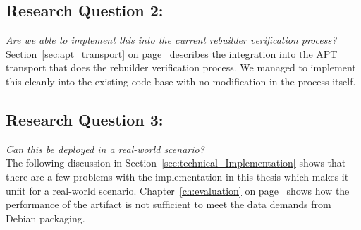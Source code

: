 \documentclass[../Main/thesis.tex]{subfiles}
\begin{document}
\subsection*{Research Question 2:}%
\label{sub:research_question_2_}
\textit{Are we able to implement this into the current rebuilder verification
process?}\\
Section~\ref{sec:apt_transport} on page~\pageref{sec:apt_transport} describes
the integration into the APT transport that does the rebuilder verification
process. We managed to implement this cleanly into the existing code base with
no modification in the process itself.

\subsection*{Research Question 3:}%
\label{sub:research_question_3_}
\textit{Can this be deployed in a real-world scenario?}\\
The following discussion in Section~\ref{sec:technical_Implementation} shows
that there are a few problems with the implementation in this thesis which makes
it unfit for a real-world scenario. Chapter~\ref{ch:evaluation} on
page~\pageref{ch:evaluation} shows how the performance of the artifact is not
sufficient to meet the data demands from Debian packaging.
\end{document}
